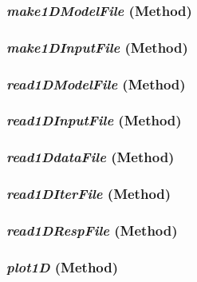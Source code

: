 \subsubsection{\textit{make1DModelFile} (Method)}
\label{sssec:.modeling.occamtools.Occam1D.make1DModelFile}



\subsubsection{\textit{make1DInputFile} (Method)}
\label{sssec:.modeling.occamtools.Occam1D.make1DInputFile}



\subsubsection{\textit{read1DModelFile} (Method)}
\label{sssec:.modeling.occamtools.Occam1D.read1DModelFile}



\subsubsection{\textit{read1DInputFile} (Method)}
\label{sssec:.modeling.occamtools.Occam1D.read1DInputFile}



\subsubsection{\textit{read1DdataFile} (Method)}
\label{sssec:.modeling.occamtools.Occam1D.read1DdataFile}



\subsubsection{\textit{read1DIterFile} (Method)}
\label{sssec:.modeling.occamtools.Occam1D.read1DIterFile}



\subsubsection{\textit{read1DRespFile} (Method)}
\label{sssec:.modeling.occamtools.Occam1D.read1DRespFile}



\subsubsection{\textit{plot1D} (Method)}
\label{sssec:.modeling.occamtools.Occam1D.plot1D}



